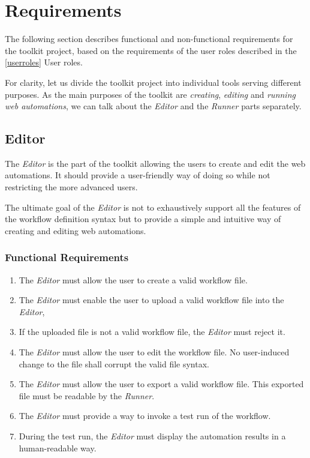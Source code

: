 
\section{Requirements}
\label{requirements}

The following section describes functional and non-functional requirements for the toolkit project, 
based on the requirements of the user roles described in the \autoref{userroles} User roles.

For clarity, let us divide the toolkit project into individual tools serving different purposes.
As the main purposes of the toolkit are \textit{creating}, \textit{editing} and \textit{running web automations},
we can talk about the \textit{Editor} and the \textit{Runner} parts separately.

\emptyline
\subsection{Editor}

The \textit{Editor} is the part of the toolkit allowing the users to create and edit the web automations.
It should provide a user-friendly way of doing so while not restricting the more advanced users.

The ultimate goal of the \textit{Editor} is not to exhaustively support all the features of the workflow definition syntax but to provide a simple and intuitive way of creating and editing web automations.

\smallskip

\subsubsection{Functional Requirements}

\begin{enumerate}[label=\thesubsection.1.\arabic*]
    \item The \textit{Editor} must allow the user to create a valid workflow file.
    \item The \textit{Editor} must enable the user to upload a valid workflow file into the \textit{Editor}, 
    \item If the uploaded file is not a valid workflow file, the \textit{Editor} must reject it.
    \item The \textit{Editor} must allow the user to edit the workflow file. 
    No user-induced change to the file shall corrupt the valid file syntax.
    \item The \textit{Editor} must allow the user to export a valid workflow file. 
    This exported file must be readable by the \textit{Runner}.
    \item The \textit{Editor} must provide a way to invoke a test run of the workflow.
    \item During the test run, the \textit{Editor} must display the automation results in a human-readable way.
\end{enumerate}

